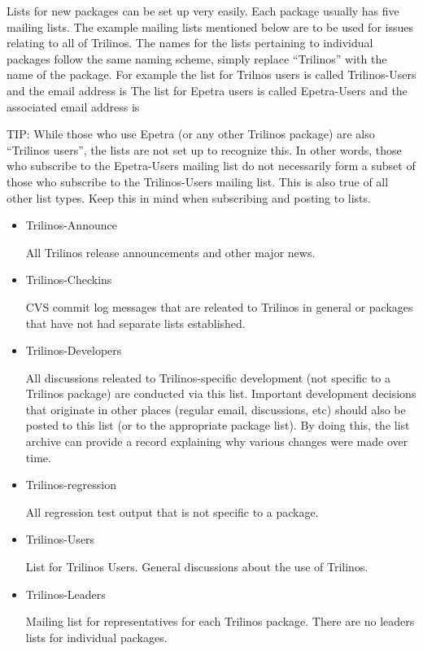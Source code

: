 \documentclass[12pt,strict]{TrilinosDevGuide}
\begin{document}
Lists for new packages can be set up very easily.  Each package usually has 
five mailing lists.  The example mailing lists mentioned below are to be used 
for issues relating to all of Trilinos.  The names for the lists pertaining to 
individual packages follow the same naming scheme, simply replace ``Trilinos'' 
with the name of the package.  For example the list for Trilnos users is 
called Trilinos-Users and the email address is 
  The list 
for Epetra users is called Epetra-Users and the associated email address is 

TIP: While those who use Epetra (or any other Trilinos package) are also
``Trilinos users'', the lists are not set up to recognize this.  In other 
words, those who subscribe to the Epetra-Users mailing list do not necessarily 
form a subset of those who subscribe to the Trilinos-Users mailing list.  This 
is also true of all other list types.  Keep this in mind when subscribing and 
posting to lists.
\begin{itemize}
\item Trilinos-Announce 

All Trilinos release announcements and other major news.

\item Trilinos-Checkins 

CVS commit log messages that are releated to Trilinos in general or packages 
that have not had separate lists established.

\item Trilinos-Developers 

All discussions releated to Trilinos-specific development (not specific to a 
Trilinos package) are conducted via this list.  Important development 
decisions that originate in other places (regular email, discussions, etc) 
should also be posted to this list (or to the appropriate package list).  
By doing this, the list archive can provide a record explaining why various 
changes were made over time.

\item Trilinos-regression 

All regression test output that is not specific to a package. 

\item Trilinos-Users 

List for Trilinos Users.  General discussions about the use of Trilinos.

\item Trilinos-Leaders

Mailing list for representatives for each Trilinos package.  There are no 
leaders lists for individual packages.
\end{itemize}
\end{document}
